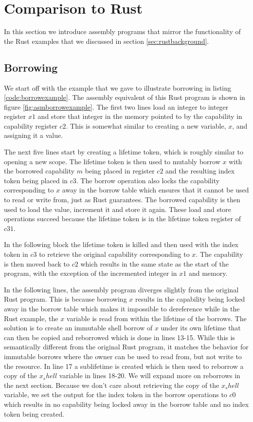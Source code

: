 \section{Comparison to Rust}
In this section we introduce assembly programs that mirror the functionality of the Rust examples that we discussed in section \ref{sec:rustbackground}.
\subsection{Borrowing}
We start off with the example that we gave to illustrate borrowing in listing \ref{code:borrowexample}.
The assembly equivalent of this Rust program is shown in figure \ref{fig:asmborrowexample}.
The first two lines load an integer to integer register $x1$ and store that integer in the memory pointed to by the capability in capability register $c2$.
This is somewhat similar to creating a new variable, $x$, and assigning it a value.

The next five lines start by creating a lifetime token, which is roughly similar to opening a new scope.
The lifetime token is then used to mutably borrow $x$ with the borrowed capability $m$ being placed in register $c2$ and the resulting index token being placed in $c3$.
The borrow operation also locks the capability corresponding to $x$ away in the borrow table which ensures that it cannot be used to read or write from, just as Rust guarantees.
The borrowed capability is then used to load the value, increment it and store it again.
These load and store operations succeed because the lifetime token is in the lifetime token register of $c31$.

In the following block the lifetime token is killed and then used with the index token in $c3$ to retrieve the original capability corresponding to $x$.
The capability is then moved back to $c2$ which results in the same state as the start of the program, with the exception of the incremented integer in $x1$ and memory.

In the following lines, the assembly program diverges slightly from the original Rust program.
This is because borrowing $x$ results in the capability being locked away in the borrow table which makes it impossible to dereference while in the Rust example, the $x$ variable is read from within the lifetime of the borrows.
The solution is to create an immutable shell borrow of $x$ under its own lifetime that can then be copied and reborrowed which is done in lines 13-15.
While this is semantically different from the original Rust program, it matches the behavior for immutable borrows where the owner can be used to read from, but not write to the resource.
In line 17 a sublifetime is created which is then used to reborrow a copy of the $x_shell$ variable in lines 18-20.
We will expand more on reborrows in the next section.
Because we don't care about retrieving the copy of the $x_shell$ variable, we set the output for the index token in the borrow operations to $c0$ which results in no capability being locked away in the borrow table and no index token being created.

